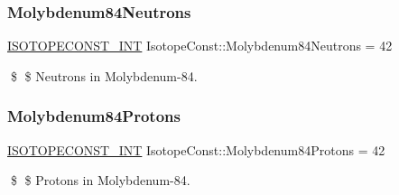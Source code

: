 \subsubsection{\texorpdfstring{Molybdenum84\+Neutrons}{Molybdenum84Neutrons}}
{\footnotesize\ttfamily \mbox{\hyperlink{group___isotope_const-_macros_ga5f18360b3e99483a35c32d789e62621c}{I\+S\+O\+T\+O\+P\+E\+C\+O\+N\+S\+T\+\_\+\+I\+NT}} Isotope\+Const\+::\+Molybdenum84\+Neutrons = 42}

\$ \$ Neutrons in Molybdenum-\/84. \mbox{\label{group___isotope_const-_molybdenum-_mo84_ga76958a2e60d0f50038134cd13d74790f}} 
\subsubsection{\texorpdfstring{Molybdenum84\+Protons}{Molybdenum84Protons}}
{\footnotesize\ttfamily \mbox{\hyperlink{group___isotope_const-_macros_ga5f18360b3e99483a35c32d789e62621c}{I\+S\+O\+T\+O\+P\+E\+C\+O\+N\+S\+T\+\_\+\+I\+NT}} Isotope\+Const\+::\+Molybdenum84\+Protons = 42}

\$ \$ Protons in Molybdenum-\/84. 